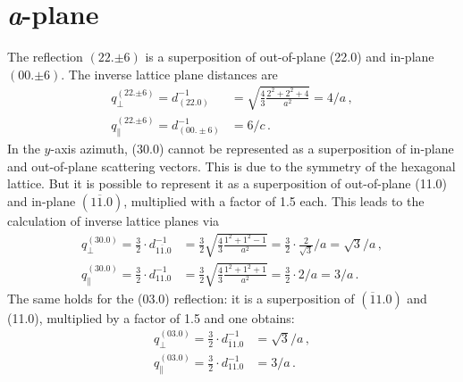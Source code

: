 \section{\textit{a}-plane}
\label{Sec:App_Calc_aPlane}
The reflection $(22.{\pm6})$ is a superposition of out-of-plane (22.0) and in-plane $(00.{\pm6})$.
The inverse lattice plane distances are
\begin{align}
    q_\perp^{(22.{\pm6})}=
    d_{(22.0)}^{-1} &=
        \sqrt{\frac{4}{3}\frac{2^2+2^2+4}{a^2}}
        = 4/a\,,\\
    q_\parallel^{(22.{\pm6})}=
    d_{(00.\pm6)}^{-1} &= 6/c \,.
\end{align}
In the $y$-axis azimuth, (30.0) cannot be represented as a superposition of in-plane and out-of-plane scattering vectors.
This is due to the symmetry of the hexagonal lattice.
But it is possible to represent it as a superposition of out-of-plane (11.0) and in-plane $(1\overline{1}.0)$, multiplied with a factor of 1.5 each.
This leads to the calculation of inverse lattice planes via
\begin{align}
    q_\perp^{(30.0)}=
    \frac{3}{2}\cdot d_{1\overline{1}.0}^{-1} &=
        \frac{3}{2}\sqrt{\frac{4}{3}\frac{1^2+1^2-1}{a^2}}
        =\frac{3}{2}\cdot\frac{2}{\sqrt{3}}/a
        =\sqrt{3}/a\,,\\
    q_\parallel^{(30.0)}=
    \frac{3}{2}\cdot d_{11.0}^{-1} &=
        \frac{3}{2}\sqrt{\frac{4}{3}\frac{1^2+1^2+1}{a^2}}
        =\frac{3}{2}\cdot2/a
        =3/a\,.
\end{align}
The same holds for the (03.0) reflection: it is a superposition of $(\overline{1}1.0)$ and (11.0), multiplied by a factor of 1.5 and one obtains:
\begin{align}
    q_\perp^{(03.0)}=
        \frac{3}{2}\cdot d_{\overline{1}1.0}^{-1} &=
        \sqrt{3}/a\,,\\
    q_\parallel^{(03.0)}=
        \frac{3}{2}\cdot d_{11.0}^{-1} &=
        3/a\,.
\end{align}
